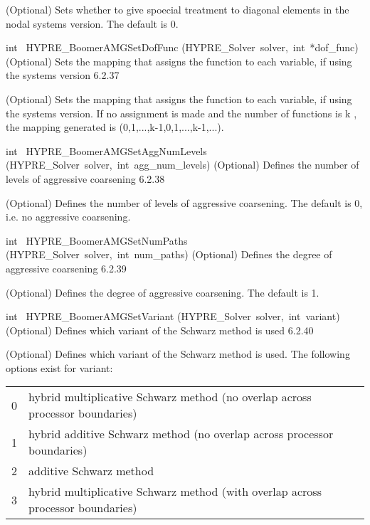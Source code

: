 \documentclass{article}
\begin{document}
\begin{cxxentry}
\begin{cxxentry}
\begin{cxxfunction}
\begin{cxxdoc}
(Optional) Sets whether to give spoecial treatment to diagonal elements in 
the nodal systems version.
The default is 0.
\end{cxxdoc}
\end{cxxfunction}
\begin{cxxfunction}
{int\ }
        {HYPRE\_BoomerAMGSetDofFunc}
        {(HYPRE\_Solver\ solver,\ int\ *dof\_func)}
        {
(Optional) Sets the mapping that assigns the function to each variable, 
if using the systems version}
        {6.2.37}
\begin{cxxdoc}

(Optional) Sets the mapping that assigns the function to each variable, 
if using the systems version. If no assignment is made and the number of
functions is k , the mapping generated is (0,1,...,k-1,0,1,...,k-1,...).
\end{cxxdoc}
\end{cxxfunction}
\begin{cxxfunction}
{int\ }
        {HYPRE\_BoomerAMGSetAggNumLevels}
        {(HYPRE\_Solver\ solver,\ int\ agg\_num\_levels)}
        {
(Optional) Defines the number of levels of aggressive coarsening}
        {6.2.38}
\begin{cxxdoc}

(Optional) Defines the number of levels of aggressive coarsening.
The default is 0, i.e. no aggressive coarsening.
\end{cxxdoc}
\end{cxxfunction}
\begin{cxxfunction}
{int\ }
        {HYPRE\_BoomerAMGSetNumPaths}
        {(HYPRE\_Solver\ solver,\ int\ num\_paths)}
        {
(Optional) Defines the degree of aggressive coarsening}
        {6.2.39}
\begin{cxxdoc}

(Optional) Defines the degree of aggressive coarsening.
The default is 1.
\end{cxxdoc}
\end{cxxfunction}
\begin{cxxfunction}
{int\ }
        {HYPRE\_BoomerAMGSetVariant}
        {(HYPRE\_Solver\ solver,\ int\ variant)}
        {
(Optional) Defines which variant of the Schwarz method is used}
        {6.2.40}
\begin{cxxdoc}

(Optional) Defines which variant of the Schwarz method is used.
The following options exist for variant:

\begin{tabular}{|c|l|} \hline
0 & hybrid multiplicative Schwarz method (no overlap across processor 
boundaries) \\
1 & hybrid additive Schwarz method (no overlap across processor 
boundaries) \\
2 & additive Schwarz method \\
3 & hybrid multiplicative Schwarz method (with overlap across processor 
boundaries) \\
\hline
\end{tabular}


\end{cxxdoc}
\end{cxxfunction}
\end{cxxentry}
\end{cxxentry}
\end{document}
